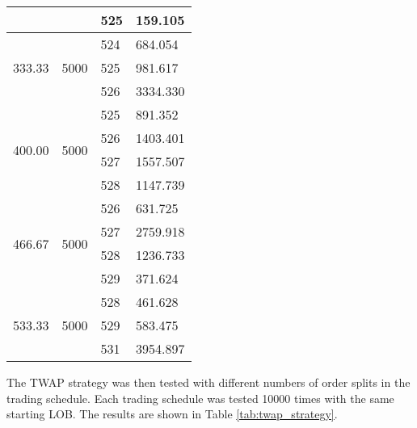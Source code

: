 \begin{table}[htbp]
\begin{center}
\begin{tabular}{l|l|l|l}
                        &                          & 525   & 159.105  \\
\hline                        
\multirow{3}{*}{333.33} & \multirow{3}{*}{5000} & 524   & 684.054  \\
                        &                          & 525   & 981.617  \\
                        &                          & 526   & 3334.330 \\
\hline                        
\multirow{4}{*}{400.00} & \multirow{4}{*}{5000} & 525   & 891.352  \\
                        &                          & 526   & 1403.401 \\
                        &                          & 527   & 1557.507 \\
                        &                          & 528   & 1147.739 \\
\hline                        
\multirow{4}{*}{466.67} & \multirow{4}{*}{5000} & 526   & 631.725  \\
                        &                          & 527   & 2759.918 \\
                        &                          & 528   & 1236.733 \\
                        &                          & 529   & 371.624  \\
\hline                        
\multirow{3}{*}{533.33} & \multirow{3}{*}{5000} & 528   & 461.628  \\
                        &                          & 529   & 583.475  \\
                        &                          & 531   & 3954.897
\end{tabular}
\end{center}
\end{table}

The TWAP strategy was then tested with different numbers of order splits in the trading schedule. Each trading schedule was tested 10000 times with the same starting LOB. The results are shown in Table \ref{tab:twap_strategy}.

